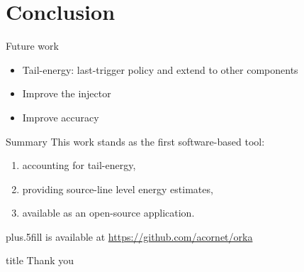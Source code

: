 \section{Conclusion}
\begin{frame}{Future work}
\begin{itemize}
\item Tail-energy: last-trigger policy and extend to other components
\item Improve the injector
\item Improve accuracy
\end{itemize}
\end{frame}
%
%
\begin{frame}{Summary}
This work stands as the first software-based tool:
\begin{enumerate}
\item accounting for \alert{tail-energy},
\item providing \alert{source-line level} energy estimates,
\item available as an \alert{open-source} application.
\end{enumerate}
\vskip0pt plus.5fill
{\small \orka{} is available at \url{https://github.com/acornet/orka}}
\end{frame}
%
%
\begin{frame}
  \vfill
  \centering
  \begin{beamercolorbox}[sep=8pt,center,shadow=true,rounded=true]{title}
    Thank you\par%
  \end{beamercolorbox}
  \vfill
\end{frame}
%
%
